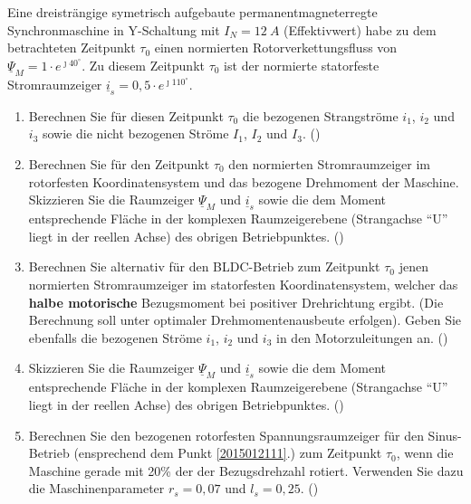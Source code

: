 \begin{question}[topic=psm,name={21.1.2015},type=exam,tags={20150121}]
Eine dreisträngige symetrisch aufgebaute permanentmagneterregte Synchronmaschine in Y-Schaltung mit $I_N = 12~A$ (Effektivwert) habe zu dem betrachteten Zeitpunkt $\tau_0$ einen normierten Rotorverkettungsfluss von $\underline{\Psi}_M = 1 \cdot e^{\jmath 40 ^\circ}$. Zu diesem Zeitpunkt $\tau_0$ ist der normierte statorfeste Stromraumzeiger $\underline{i}_s = 0,5 \cdot e^{\jmath 110 ^\circ}$.
\begin{enumerate}
\item Berechnen Sie für diesen Zeitpunkt $\tau_0$ die bezogenen Strangströme $i_1$, $i_2$ und $i_3$ sowie die nicht bezogenen Ströme $I_1$, $I_2$ und $I_3$. ()\label{2015012111}
\item Berechnen Sie für den Zeitpunkt $\tau_0$ den normierten Stromraumzeiger im rotorfesten Koordinatensystem und das bezogene Drehmoment der Maschine. Skizzieren Sie die Raumzeiger $\underline{\Psi}_M$ und $\underline{i}_s$ sowie die dem Moment entsprechende Fläche in der komplexen Raumzeigerebene (Strangachse ``U'' liegt in der reellen Achse) des obrigen Betriebpunktes. ()
\item Berechnen Sie alternativ für den BLDC-Betrieb zum Zeitpunkt $\tau_0$ jenen normierten Stromraumzeiger im statorfesten Koordinatensystem, welcher das \textbf{halbe motorische} Bezugsmoment bei positiver Drehrichtung ergibt. (Die Berechnung soll unter optimaler Drehmomentenausbeute erfolgen). Geben Sie ebenfalls die bezogenen Ströme $i_1$, $i_2$ und $i_3$ in den Motorzuleitungen an. ()
\item Skizzieren Sie die Raumzeiger $\underline{\Psi}_M$ und $\underline{i}_s$ sowie die dem Moment entsprechende Fläche in der komplexen Raumzeigerebene (Strangachse ``U'' liegt in der reellen Achse) des obrigen Betriebpunktes. ()
\item Berechnen Sie den bezogenen rotorfesten Spannungsraumzeiger für den Sinus-Betrieb (ensprechend dem Punkt \ref{2015012111}.) zum Zeitpunkt $\tau_0$, wenn die Maschine gerade mit 20\% der der Bezugsdrehzahl rotiert. Verwenden Sie dazu die Maschinenparameter $r_s = 0,07$ und $l_s= 0,25$. ()
\end{enumerate}
\end{question}
